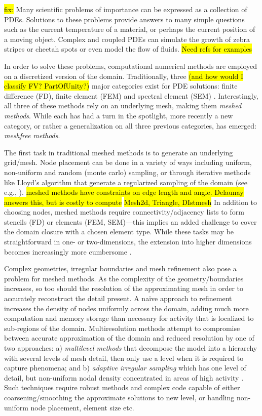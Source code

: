 \hl{fix:}
Many scientific problems of importance can be expressed as a
collection of PDEs. Solutions to these problems provide answers to many simple
questions such as the current temperature of a material, or perhaps the
current position of a moving object. Complex and coupled PDEs can simulate the growth of zebra stripes or cheetah spots \cite{FuselierWright2012} or even model the flow of fluids. \hl{Need refs for examples}


In order to solve these problems, computational numerical
methods are employed on a discretized version of the domain.
Traditionally, three \hl{(and how would I classify FV? PartOfUnity?)} major categories exist for PDE solutions:
finite difference (FD), finite element (FEM) and spectral
element (SEM) \cite{Fasshauer2007}. Interestingly, all three of
these methods rely on an underlying mesh, making them
\emph{meshed methods}. While each has had a turn in the
spotlight, more recently a new category, or rather a
generalization on all three previous categories, has emerged:
\emph{meshfree methods}.

The first task in traditional meshed methods is to generate an
underlying grid/mesh. Node placement can be done in a variety of
ways including uniform, non-uniform and random (monte carlo)
sampling, or through iterative methods like Lloyd's algorithm
that generate a regularized sampling of the domain (see e.g.,
\cite{Du1999}). \hl{meshed methods have constraints on edge length and angle. Delaunay answers this, but is costly to compute}
\hl{Mesh2d, Triangle, DIstmesh} In addition to choosing nodes, meshed methods
require connectivity/adjacency lists to form stencils (FD) or
elements (FEM, SEM)---this implies an added challenge to cover
the domain closure with a chosen element type. While these tasks
may be straightforward in one- or two-dimensions, the extension
into higher dimensions becomes increasingly more cumbersome
\cite{Li2007}. 

Complex geometries, irregular boundaries and mesh refinement also pose a problem for meshed methods. As the complexity of 
the geometry/boundaries increases, so too should the resolution of the approximating mesh in order to 
accurately reconstruct the detail present. A na\"{i}ve approach to refinement increases the density of nodes uniformly across the 
domain, adding much more computation and memory storage than necessary for activity that is localized to sub-regions 
of the domain. Multiresolution methods attempt to compromise between accurate approximation of the domain and 
reduced resolution by one of two approaches: a) \emph{multilevel methods} that decompose the model into a hierarchy with 
several levels of mesh detail, then only use a level when it is required to capture phenomena; and b) \emph{adaptive irregular 
sampling} which has one level of detail, but non-uniform nodal density concentrated in areas of high activity \cite
{Iske2004}. Such techniques require robust methods and complex code capable of either coarsening/smoothing the 
approximate solutions to new level, or handling non-uniform node placement, element size etc. 

